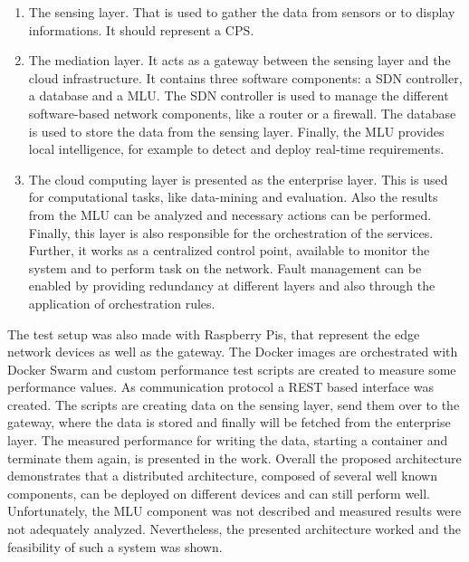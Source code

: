 \begin{enumerate}
  \item The sensing layer.
  That is used to gather the data from sensors or to display informations.
  It should represent a \ac{CPS}.
  \item The mediation layer.
  It acts as a gateway between the sensing layer and the cloud infrastructure.
  It contains three software components: a \ac{SDN} controller, a database and a \ac{MLU}.\autocite[cf.][p. 1534]{Rufino:2017}
  The \ac{SDN} controller is used to manage the different software-based network components, like a router or a firewall.
  The database is used to store the data from the sensing layer.
  Finally, the \ac{MLU} provides local intelligence, for example to detect and deploy real-time requirements.\autocite[cf.][p. 1534]{Rufino:2017}
  \item The cloud computing layer is presented as the enterprise layer.
  This is used for computational tasks, like data-mining and evaluation.\autocite[cf.][p. 1534]{Rufino:2017}
  Also the results from the \ac{MLU} can be analyzed and necessary actions can be performed.\autocite[cf.][p. 1534]{Rufino:2017}
  Finally, this layer is also responsible for the orchestration of the services.
  Further, it works as a centralized control point, available to monitor the system and to perform task on the network.
  Fault management can be enabled by providing redundancy at different layers and also through the application of orchestration rules.\autocite[cf.][p. 1535]{Rufino:2017}
\end{enumerate}

The test setup was also made with Raspberry Pis, that represent the edge network devices as well as the gateway.
The Docker images are orchestrated with Docker Swarm and custom performance test scripts are created to measure some performance values.
As communication protocol a \ac{REST} based interface was created.
The scripts are creating data on the sensing layer, send them over to the gateway, where the data is stored and finally will be fetched from the enterprise layer.\autocite[cf.][p. 1535]{Rufino:2017}
The measured performance for writing the data, starting a container and terminate them again, is presented in the work.
Overall the proposed architecture demonstrates that a distributed architecture, composed of several well known components, can be deployed on different devices and can still perform well.
Unfortunately, the \ac{MLU} component was not described and measured results were not adequately analyzed.
Nevertheless, the presented architecture worked and the feasibility of such a system was shown.

